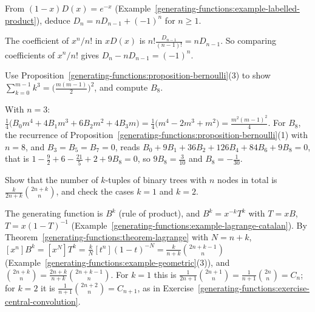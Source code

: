\begin{exercise}\label{generating-functions:exercise-derangement-recurrence}
From $(1 - x)D(x) = e^{-x}$ (Example~\ref{generating-functions:example-labelled-product}), deduce $D_n = nD_{n-1} + (-1)^n$ for $n \geq 1$.
\end{exercise}

\begin{solution}
The coefficient of $x^n/n!$ in $xD(x)$ is $n!\frac{D_{n-1}}{(n - 1)!} = nD_{n-1}$. So comparing coefficients of $x^n/n!$ gives $D_n - nD_{n-1} = (-1)^n$.
\end{solution}

\begin{exercise}\label{generating-functions:exercise-sum-cubes-bernoulli}
Use Proposition~\ref{generating-functions:proposition-bernoulli}(3) to show $\sum_{k=0}^{m-1}k^3 = \bigl(\frac{m(m - 1)}{2}\bigr)^2$, and compute $B_8$.
\end{exercise}

\begin{solution}
With $n = 3$: $\frac14\bigl(B_0m^4 + 4B_1m^3 + 6B_2m^2 + 4B_3m\bigr) = \frac14\bigl(m^4 - 2m^3 + m^2\bigr) = \frac{m^2(m - 1)^2}{4}$. For $B_8$, the recurrence of
Proposition~\ref{generating-functions:proposition-bernoulli}(1) with $n = 8$, and $B_3 = B_5 = B_7 = 0$, reads
$B_0 + 9B_1 + 36B_2 + 126B_4 + 84B_6 + 9B_8 = 0$, that is $1 - \frac92 + 6 - \frac{21}{5} + 2 + 9B_8 = 0$, so $9B_8 = \frac{3}{10}$ and $B_8 = -\frac{1}{30}$.
\end{solution}

\begin{exercise}\label{generating-functions:exercise-ballot-numbers}
Show that the number of $k$-tuples of binary trees with $n$ nodes in total is $\frac{k}{2n + k}\binom{2n + k}{n}$, and check the cases $k = 1$ and $k = 2$.
\end{exercise}

\begin{solution}
The generating function is $B^k$ (rule of product), and $B^k = x^{-k}T^k$ with $T = xB$, $T = x(1 - T)^{-1}$ (Example~\ref{generating-functions:example-lagrange-catalan}). By
Theorem~\ref{generating-functions:theorem-lagrange} with $N = n + k$,
$[x^n]B^k = [x^N]T^k = \frac{k}{N}[t^{n}](1 - t)^{-N} = \frac{k}{n + k}\binom{2n + k - 1}{n}$ (Example~\ref{generating-functions:example-geometric}(3)), and
$\binom{2n + k}{n} = \frac{2n + k}{n + k}\binom{2n + k - 1}{n}$. For $k = 1$ this is $\frac{1}{2n + 1}\binom{2n + 1}{n} = \frac{1}{n + 1}\binom{2n}{n} = C_n$; for $k = 2$ it is
$\frac{1}{n + 1}\binom{2n + 2}{n} = C_{n+1}$, as in Exercise~\ref{generating-functions:exercise-central-convolution}.
\end{solution}

